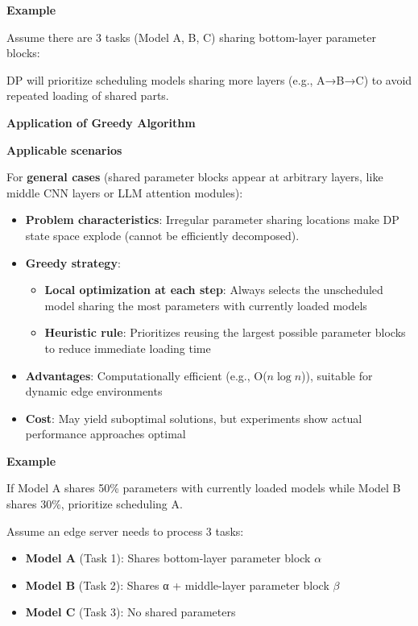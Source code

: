 \documentclass[conference]{IEEEtran}
\begin{document}
\begin{CJK}{UTF8}{gbsn}
\begin{itemize}
\textbf{Example}

Assume there are 3 tasks (Model A, B, C) sharing bottom-layer parameter blocks:

DP will prioritize scheduling models sharing more layers (e.g., A→B→C) to avoid repeated loading of shared parts.

\textbf{Application of Greedy Algorithm}

\textbf{Applicable scenarios}

For \textbf{general cases} (shared parameter blocks appear at arbitrary layers, like middle CNN layers or LLM attention modules):

\begin{itemize}
\item \textbf{Problem characteristics}: Irregular parameter sharing locations make DP state space explode (cannot be efficiently decomposed).
\item \textbf{Greedy strategy}:
\begin{itemize}
\item \textbf{Local optimization at each step}: Always selects the unscheduled model sharing the most parameters with currently loaded models
\item \textbf{Heuristic rule}: Prioritizes reusing the largest possible parameter blocks to reduce immediate loading time
\end{itemize}
\item \textbf{Advantages}: Computationally efficient (e.g., O($n\log n$)), suitable for dynamic edge environments
\item \textbf{Cost}: May yield suboptimal solutions, but experiments show actual performance approaches optimal
\end{itemize}

\textbf{Example}

If Model A shares 50\% parameters with currently loaded models while Model B shares 30\%, prioritize scheduling A.


Assume an edge server needs to process 3 tasks:

\begin{itemize}
\item \textbf{Model A} (Task 1): Shares bottom-layer parameter block $\alpha$
\item \textbf{Model B} (Task 2): Shares α + middle-layer parameter block $\beta$
\item \textbf{Model C} (Task 3): No shared parameters
\end{itemize}


\end{itemize}
\end{CJK}
\end{document}
